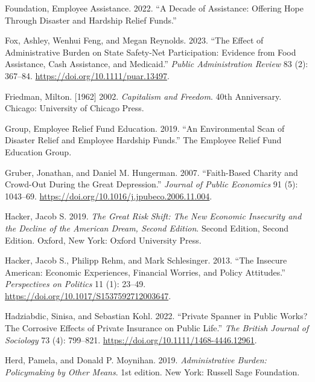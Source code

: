 \documentclass[
  11pt,
  oneside]{article}
\newlength{\cslhangindent}
\newenvironment{CSLReferences}[2] %
 {\begin{list}{}{%
  \setlength{\itemindent}{0pt}
  \setlength{\leftmargin}{0pt}
  \setlength{\parsep}{0pt}
  \ifodd #1
   \setlength{\leftmargin}{\cslhangindent}
   \setlength{\itemindent}{-1\cslhangindent}
  \fi
  \setlength{\itemsep}{#2\baselineskip}}}
 {\end{list}}
\begin{document}
\begin{CSLReferences}{1}{0}
Foundation, Employee Assistance. 2022. {``A {Decade} of {Assistance}: Offering Hope Through Disaster and Hardship Relief Funds.''}

Fox, Ashley, Wenhui Feng, and Megan Reynolds. 2023. {``The Effect of Administrative Burden on State Safety-Net Participation: {Evidence} from Food Assistance, Cash Assistance, and {Medicaid}.''} \emph{Public Administration Review} 83 (2): 367--84. \url{https://doi.org/10.1111/puar.13497}.

Friedman, Milton. {[}1962{]} 2002. \emph{Capitalism and {Freedom}}. 40th Anniversary. Chicago: University of Chicago Press.

Group, Employee Relief Fund Education. 2019. {``An {Environmental Scan} of {Disaster Relief} and {Employee Hardship Funds}.''} The Employee Relief Fund Education Group.

Gruber, Jonathan, and Daniel M. Hungerman. 2007. {``Faith-Based Charity and Crowd-Out During the Great Depression.''} \emph{Journal of Public Economics} 91 (5): 1043--69. \url{https://doi.org/10.1016/j.jpubeco.2006.11.004}.

Hacker, Jacob S. 2019. \emph{The {Great Risk Shift}: {The New Economic Insecurity} and the {Decline} of the {American Dream}, {Second Edition}}. Second Edition, Second Edition. Oxford, New York: Oxford University Press.

Hacker, Jacob S., Philipp Rehm, and Mark Schlesinger. 2013. {``The {Insecure American}: {Economic Experiences}, {Financial Worries}, and {Policy Attitudes}.''} \emph{Perspectives on Politics} 11 (1): 23--49. \url{https://doi.org/10.1017/S1537592712003647}.

Hadziabdic, Sinisa, and Sebastian Kohl. 2022. {``Private Spanner in Public Works? {The} Corrosive Effects of Private Insurance on Public Life.''} \emph{The British Journal of Sociology} 73 (4): 799--821. \url{https://doi.org/10.1111/1468-4446.12961}.

Herd, Pamela, and Donald P. Moynihan. 2019. \emph{Administrative {Burden}: {Policymaking} by {Other Means}}. 1st edition. New York: Russell Sage Foundation.


\end{CSLReferences}
\end{document}
